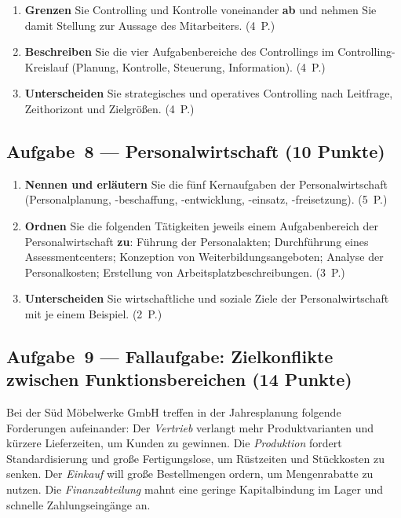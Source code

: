 \documentclass[11pt, a4paper]{article}
\begin{document}
\begin{enumerate}[label=(\alph*)]
  \item \textbf{Grenzen} Sie Controlling und Kontrolle voneinander \textbf{ab} und nehmen
    Sie damit Stellung zur Aussage des Mitarbeiters. \hfill (4~P.)
  \item \textbf{Beschreiben} Sie die vier Aufgabenbereiche des Controllings im
    Controlling-Kreislauf (Planung, Kontrolle, Steuerung, Information). \hfill (4~P.)
  \item \textbf{Unterscheiden} Sie strategisches und operatives Controlling nach
    Leitfrage, Zeithorizont und Zielgrößen. \hfill (4~P.)
\end{enumerate}

\subsection*{Aufgabe~8 --- Personalwirtschaft (10 Punkte)}

\begin{enumerate}[label=(\alph*)]
  \item \textbf{Nennen und erläutern} Sie die fünf Kernaufgaben der Personalwirtschaft
    (Personalplanung, -beschaffung, -entwicklung, -einsatz, -freisetzung). \hfill (5~P.)
  \item \textbf{Ordnen} Sie die folgenden Tätigkeiten jeweils einem Aufgabenbereich der
    Personalwirtschaft \textbf{zu}: Führung der Personalakten; Durchführung eines
    Assessmentcenters; Konzeption von Weiterbildungsangeboten; Analyse der Personalkosten;
    Erstellung von Arbeitsplatzbeschreibungen. \hfill (3~P.)
  \item \textbf{Unterscheiden} Sie wirtschaftliche und soziale Ziele der
    Personalwirtschaft mit je einem Beispiel. \hfill (2~P.)
\end{enumerate}

\subsection*{Aufgabe~9 --- Fallaufgabe: Zielkonflikte zwischen Funktionsbereichen (14 Punkte)}

Bei der Süd Möbelwerke GmbH treffen in der Jahresplanung folgende Forderungen aufeinander:
Der \emph{Vertrieb} verlangt mehr Produktvarianten und kürzere Lieferzeiten, um Kunden zu
gewinnen. Die \emph{Produktion} fordert Standardisierung und große Fertigungslose, um
Rüstzeiten und Stückkosten zu senken. Der \emph{Einkauf} will große Bestellmengen ordern,
um Mengenrabatte zu nutzen. Die \emph{Finanzabteilung} mahnt eine geringe Kapitalbindung
im Lager und schnelle Zahlungseingänge an.
\end{document}
